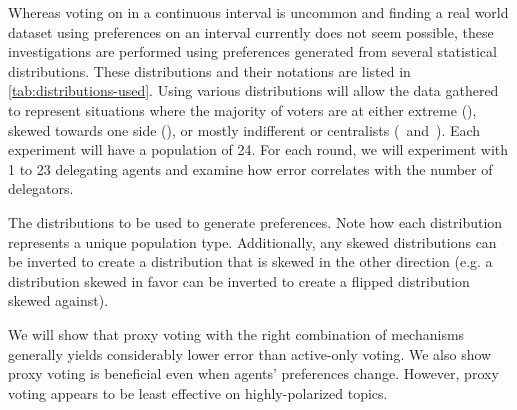 Whereas voting on in a continuous interval is uncommon and finding a real world dataset
using preferences on an interval currently does not seem possible, these investigations
are performed using preferences generated from several statistical distributions.
These distributions and their notations are listed in \autoref{tab:distributions-used}.
Using various distributions will allow the data gathered to represent situations
where the majority of voters are at either extreme (),
skewed towards one side (), or mostly indifferent or centralists  
(\gaussiandist~and~).
Each experiment will have a population of 24.
For each round, we will experiment with 1 to 23 delegating agents and examine how
error correlates with the number of delegators.  

\begin{table}[!htbp]
    \renewcommand{\arraystretch}{1.3}

    \caption{
        The distributions to be used to generate preferences.
        Note how each distribution represents a unique population type.
        Additionally, any skewed distributions can be inverted to create a
        distribution that is skewed in the other direction (e.g. a distribution
        skewed in favor can be inverted to create a flipped distribution skewed
        against).
    }
    \label{tab:distributions-used}

    \centering
    
\end{table}

We will show that proxy voting with the right combination of mechanisms generally
yields considerably lower error than active-only voting.
We also show proxy voting is beneficial even when agents' preferences change.
However, proxy voting appears to be least effective on highly-polarized topics.
